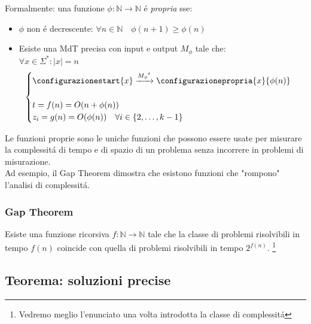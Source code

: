 Formalmente: una funzione $\phi: \mathbb{N} \rightarrow \mathbb{N}$ é \textit{propria} sse:
\begin{itemize}
	\item $\phi$ non é decrescente: \quad $\forall n \in \mathbb{N} \quad \phi(n+1) \geq \phi(n)$
	\item Esiste una MdT precisa con input e output $M_\phi$ tale che:\\ $\forall x \in \Sigma^* : |x| = n$ \\
	\[
	\begin{cases}
		\configurazionestart{x} \xrightarrow{{M_\phi}^t} \configurazionepropria{x}{\phi(n)} \\
		\\
		t = f(n) = O(n + \phi(n)) \\
		z_i = g(n) = O(\phi(n)) \quad \forall i \in \{2, \dots, k-1\}
	\end{cases}
	\]
\end{itemize}

Le funzioni proprie sono le uniche funzioni che possono essere usate per misurare la complessitá di tempo e di spazio di un problema senza incorrere in problemi di misurazione.\\ 
Ad esempio, il Gap Theorem dimostra che esistono funzioni che "rompono" l'analisi di complessitá.

\subsubsection*{Gap Theorem}
Esiste una funzione ricorsiva $f: \mathbb{N} \rightarrow \mathbb{N}$ tale che la classe di problemi risolvibili in tempo $f(n)$ coincide con quella di problemi risolvibili in tempo $2^{f(n)}$. \footnote{Vedremo meglio l'enunciato una volta introdotta la classe di complessitá }

\subsection{Teorema: soluzioni precise}

